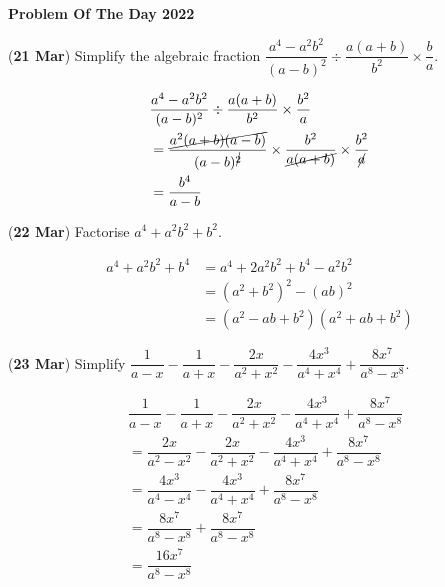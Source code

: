 \documentclass[12pt, answers]{exam}
\begin{document}
\onehalfspacing%
\begin{center}
	\Large
	\textbf{Problem Of The Day 2022}
\end{center}

\begin{questions}

	\question (\textbf{21 Mar}) Simplify the algebraic fraction
	\( \dfrac{a^4-a^2b^2}{(a-b)^2} \div \dfrac{a(a+b)}{b^2} \times \dfrac{b}{a} \).

	\begin{solution}
		\begin{align*}
			 & \dfrac{a^4-a^2b^2}{(a-b)^2} \div \dfrac{a(a+b)}{b^2} \times \dfrac{b^2}{a}                                              \\
			 & = \dfrac{\cancel{a^2(a+b)(a-b)}}{(a-b)^{\cancel{2}}} \times \dfrac{b^2}{\cancel{a(a+b)}} \times \dfrac{b^2}{\cancel{a}} \\
			 & = \dfrac{b^4}{a-b}
		\end{align*}
	\end{solution}


	\question (\textbf{22 Mar}) Factorise \(a^4+a^2b^2+b^2\).
	\begin{solution}
		\begin{align*}
			a^4 + a^2b^2 + b^4 & = a^4 + 2a^2b^2 + b^4 - a^2b^2     \\
			                   & = (a^2 + b^2)^2 - (ab)^2           \\
			                   & = (a^2 - ab + b^2)(a^2 + ab + b^2)
		\end{align*}
	\end{solution}


	\question (\textbf{23 Mar}) Simplify \(\dfrac{1}{a-x}-\dfrac{1}{a+x}-\dfrac{2x}{a^2+x^2}-\dfrac{4x^3}{a^4+x^4}+\dfrac{8x^7}{a^8-x^8}\).
	\begin{solution}
		\begin{align*}
			 & \dfrac{1}{a-x}-\dfrac{1}{a+x}-\dfrac{2x}{a^2+x^2}-\dfrac{4x^3}{a^4+x^4}+\dfrac{8x^7}{a^8-x^8} \\
			 & = \dfrac{2x}{a^2-x^2}-\dfrac{2x}{a^2+x^2}-\dfrac{4x^3}{a^4+x^4}+\dfrac{8x^7}{a^8-x^8}         \\
			 & = \dfrac{4x^3}{a^4-x^4}-\dfrac{4x^3}{a^4+x^4}+\dfrac{8x^7}{a^8-x^8}                           \\
			 & = \dfrac{8x^7}{a^8-x^8}+\dfrac{8x^7}{a^8-x^8}                                                 \\
			 & = \dfrac{16x^7}{a^8-x^8}
		\end{align*}
	\end{solution}


\end{questions}
\end{document}
